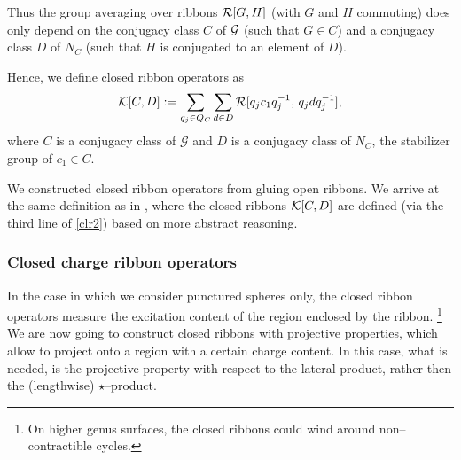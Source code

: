 \documentclass[nofootinbib,superscriptaddress,eqsecnum,tightenlines,11pt]{revtex4-1}
\def\mG{\mathcal{G}}
\def\ba{\begin{eqnarray}}
\def\ea{\end{eqnarray}}
\begin{document}
Thus the group averaging over ribbons ${\cal R}[G,H]$ (with $G$ and $H$ commuting) does only depend on the conjugacy class $C$ of ${\cal G}$  (such that $G \in C$) and a conjugacy class $D$ of ${N_C}$ (such that  $H$ is conjugated to an element of $D$).%

Hence, we define closed ribbon operators as
\ba\label{defK}
{\cal K}[C,D] := \sum_{q_j \in Q_C} \sum_{ d \in D}   {\cal R}[  q_j c_1 q_j^{-1} ,\, q_j d  q_j^{-1}]   ,
\ea
where $C$ is a conjugacy class of $\mG$ and $D$ is a conjugacy class of $N_C$, the stabilizer group of $c_1 \in C$.

We constructed closed ribbon operators from gluing open ribbons. 
We arrive at the same definition as in \cite{Bombin}, where the closed ribbons ${\cal K}[C,D]$  are defined (via the third line of \ref{clr2}) based on more abstract reasoning. 


\subsubsection{ Closed charge ribbon operators} \label{clchri}

In the case in which we consider punctured spheres only, the closed ribbon operators measure the excitation content of the region enclosed by the ribbon.%
\footnote{On higher genus surfaces, the closed ribbons could wind around non--contractible cycles.}
We are now going to construct closed ribbons with  projective properties, which allow to project onto a region with a certain charge content. 
In this case, what is needed, is the projective property with respect to the lateral product, rather then the (lengthwise) $\star$--product.
\end{document}
